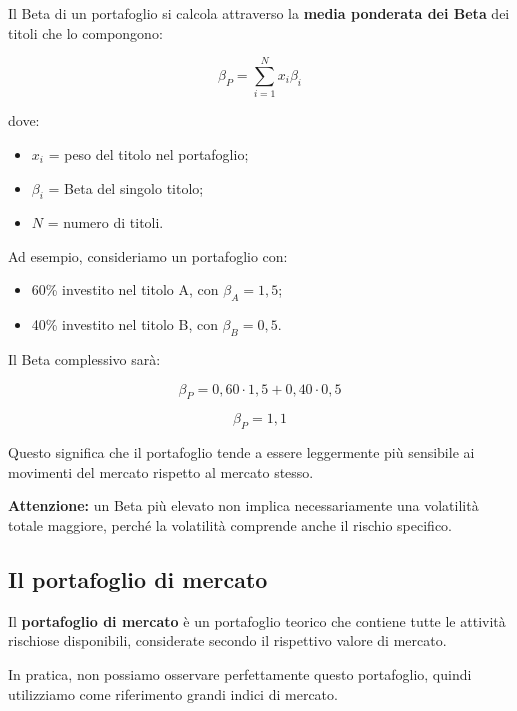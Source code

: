 \medskip

\noindent Il Beta di un portafoglio si calcola
attraverso la \textbf{media ponderata dei Beta}
dei titoli che lo compongono:

\[
\boxed{
\beta_P=\sum_{i=1}^{N}x_i\beta_i
}
\]

\noindent dove:

\begin{itemize}
    \item $x_i$ = peso del titolo nel portafoglio;
    \item $\beta_i$ = Beta del singolo titolo;
    \item $N$ = numero di titoli.
\end{itemize}

\noindent Ad esempio, consideriamo un portafoglio con:

\begin{itemize}
    \item 60\% investito nel titolo A, con $\beta_A=1{,}5$;
    \item 40\% investito nel titolo B, con $\beta_B=0{,}5$.
\end{itemize}

\noindent Il Beta complessivo sarà:

\[
\beta_P=0{,}60\cdot1{,}5+0{,}40\cdot0{,}5
\]

\[
\boxed{\beta_P=1{,}1}
\]

\noindent Questo significa che il portafoglio tende
a essere leggermente più sensibile ai movimenti
del mercato rispetto al mercato stesso.

\medskip

\noindent \textbf{Attenzione:} un Beta più elevato
non implica necessariamente una volatilità totale
maggiore, perché la volatilità comprende anche
il rischio specifico.


\subsection{Il portafoglio di mercato}

\noindent Il \textbf{portafoglio di mercato} è un
portafoglio teorico che contiene tutte le attività
rischiose disponibili, considerate secondo
il rispettivo valore di mercato.

\medskip

\noindent In pratica, non possiamo osservare
perfettamente questo portafoglio, quindi
utilizziamo come riferimento grandi indici
di mercato.

\medskip

